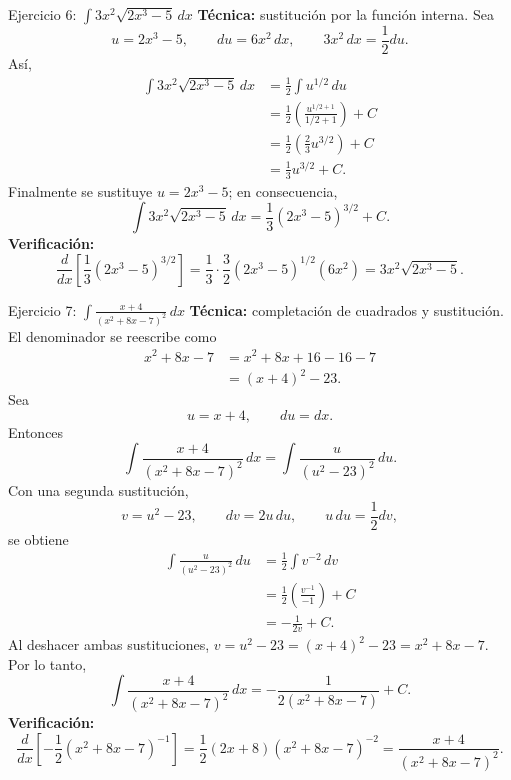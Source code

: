 \begin{activitybox}{Ejercicio 6: $\displaystyle \int3x^2\sqrt{2x^3-5}\,dx$}
\textbf{Técnica:} sustitución por la función interna. Sea
\[
 u=2x^3-5,\qquad du=6x^2\,dx,
 \qquad 3x^2\,dx=\frac12du.
\]
Así,
\begin{align*}
 \int3x^2\sqrt{2x^3-5}\,dx
 &=\frac12\int u^{1/2}\,du\\
 &=\frac12\left(\frac{u^{1/2+1}}{1/2+1}\right)+C\\
 &=\frac12\left(\frac23u^{3/2}\right)+C\\
 &=\frac13u^{3/2}+C.
\end{align*}
Finalmente se sustituye $u=2x^3-5$; en consecuencia,
\[
 \boxed{\int3x^2\sqrt{2x^3-5}\,dx
 =\frac13(2x^3-5)^{3/2}+C}.
\]
\textbf{Verificación:}
\[
 \frac{d}{dx}\left[\frac13(2x^3-5)^{3/2}\right]
 =\frac13\cdot\frac32(2x^3-5)^{1/2}(6x^2)
 =3x^2\sqrt{2x^3-5}.
\]
\end{activitybox}

\begin{activitybox}{Ejercicio 7: $\displaystyle \int\frac{x+4}{(x^2+8x-7)^2}\,dx$}
\textbf{Técnica:} completación de cuadrados y sustitución. El denominador se reescribe como
\begin{align*}
 x^2+8x-7
 &=x^2+8x+16-16-7\\
 &=(x+4)^2-23.
\end{align*}
Sea
\[
 u=x+4,\qquad du=dx.
\]
Entonces
\[
 \int\frac{x+4}{(x^2+8x-7)^2}\,dx
 =\int\frac{u}{(u^2-23)^2}\,du.
\]
Con una segunda sustitución,
\[
 v=u^2-23,\qquad dv=2u\,du,
 \qquad u\,du=\frac12dv,
\]
se obtiene
\begin{align*}
 \int\frac{u}{(u^2-23)^2}\,du
 &=\frac12\int v^{-2}\,dv\\
 &=\frac12\left(\frac{v^{-1}}{-1}\right)+C\\
 &=-\frac1{2v}+C.
\end{align*}
Al deshacer ambas sustituciones, $v=u^2-23=(x+4)^2-23=x^2+8x-7$. Por lo tanto,
\[
 \boxed{\int\frac{x+4}{(x^2+8x-7)^2}\,dx
 =-\frac1{2(x^2+8x-7)}+C}.
\]
\textbf{Verificación:}
\[
 \frac{d}{dx}\left[-\frac12(x^2+8x-7)^{-1}\right]
 =\frac12(2x+8)(x^2+8x-7)^{-2}
 =\frac{x+4}{(x^2+8x-7)^2}.
\]
\end{activitybox}

